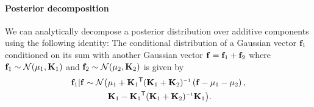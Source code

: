 \documentclass[twoside]{article}
\renewcommand{\fTBD}[1]{}
\begin{document}
\paragraph{Posterior decomposition}
\label{sec:decomposing}
We can analytically decompose a \gp{} posterior distribution over additive components using the following identity:
The conditional distribution of a Gaussian vector ${\bf{f}}_1$ conditioned on its sum with another Gaussian vector ${\bf{f}} = {\bf{f}}_1 + {\bf{f}}_2$ where ${\bf{f}}_1 \sim \mathcal{N}\!\left({\bf{\mu}}_1,\mathbf{K}_1\right)$ and ${\bf{f}}_2 \sim \mathcal{N}\!\left({\bf{\mu}}_2,\mathbf{K}_2\right)$ is given by
%
\begin{align}
\vf_1 | \vf \sim \mathcal{N} \big( & \vmu_1 + \vK_1\tra (\vK_1 + \vK_2)\inv \left( \vf - \vmu_1 - \vmu_2 \right), \nonumber \\
& \vK_1 - \vK_1\tra (\vK_1 + \vK_2)\inv \vK_1 \big) \nonumber .
\end{align}
%

\newpage


\end{document}
